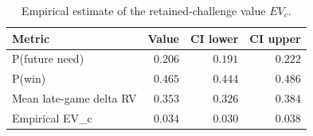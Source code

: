 \begin{table}[h]
\centering
\caption{Empirical estimate of the retained-challenge value $EV_c$.}
\label{tab:evc}
\small
\begin{tabular}{lrrr}
\toprule
Metric & Value & CI lower & CI upper \\
\midrule
P(future need) & $0.206$ & $0.191$ & $0.222$ \\
P(win) & $0.465$ & $0.444$ & $0.486$ \\
Mean late-game delta RV & $0.353$ & $0.326$ & $0.384$ \\
Empirical EV\_c & $0.034$ & $0.030$ & $0.038$ \\
\bottomrule
\end{tabular}
\end{table}
